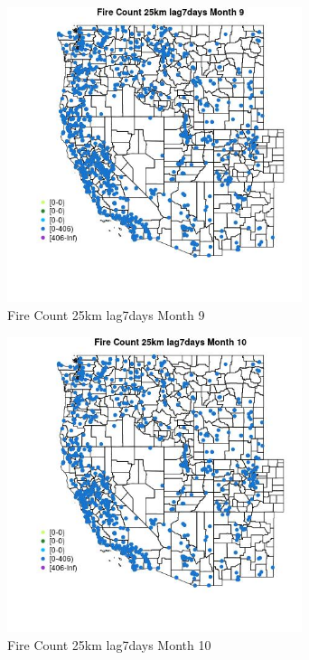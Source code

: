\begin{figure} 
\centering  
\includegraphics[width=0.77\textwidth]{Code_Outputs/Report_ML_input_PM25_Step4_part_f_de_duplicated_aves_prioritize_24hr_obswNAs_MapObsMo9Fire_Count_25km_lag7days.jpg} 
\caption{\label{fig:Report_ML_input_PM25_Step4_part_f_de_duplicated_aves_prioritize_24hr_obswNAsMapObsMo9Fire_Count_25km_lag7days}Fire Count 25km lag7days Month 9} 
\end{figure} 
 

\begin{figure} 
\centering  
\includegraphics[width=0.77\textwidth]{Code_Outputs/Report_ML_input_PM25_Step4_part_f_de_duplicated_aves_prioritize_24hr_obswNAs_MapObsMo10Fire_Count_25km_lag7days.jpg} 
\caption{\label{fig:Report_ML_input_PM25_Step4_part_f_de_duplicated_aves_prioritize_24hr_obswNAsMapObsMo10Fire_Count_25km_lag7days}Fire Count 25km lag7days Month 10} 
\end{figure} 
 

